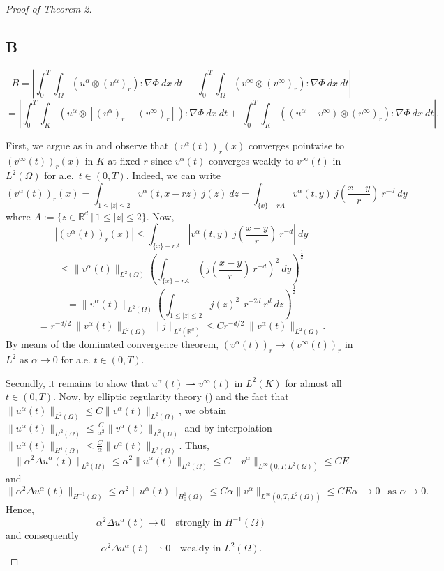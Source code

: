 \documentclass{amsart}
\begin{document}
\begin{proof}[Proof of Theorem 2]
\subsection*{B}
$$ B = \left| \int_0^T \int_{\Omega} (u^{\alpha} \otimes (v^{\alpha})_r) : \nabla \Phi \ dx \ dt - \ \int_0^T \int_{\Omega} (v^{\infty} \otimes (v^{\infty})_r) : \nabla \Phi \ dx \ dt \right|$$
$$ = \left| \int_0^T \int_{K} \left(u^{\alpha} \otimes [(v^{\alpha})_r-(v^{\infty})_r]\right) : \nabla \Phi \ dx \ dt + \ \int_0^T \int_{K} ((u^{\alpha}-v^{\infty}) \otimes (v^{\infty})_r) : \nabla \Phi \ dx \ dt \right|. $$

First, we argue as in \cite{Constantin.2018} and observe that $(v^{\alpha}(t))_r(x)$ converges pointwise to $(v^{\infty}(t))_r(x)$ in $K$ at fixed $r$ since $v^{\alpha}(t)$ converges weakly to $v^{\infty}(t)$ in $L^2(\Omega)$ for a.e.\ $t\in (0,T)$. Indeed, we can write
$$ (v^{\alpha}(t))_r(x)=\int_{1\leq|z|\leq2} v^{\alpha}\left(t,x-rz\right) \ j(z) \ dz = \int_{\{x\}-rA} v^{\alpha}(t,y) \ j\left(\frac{x-y}{r}\right) \  r^{-d} \ dy$$
where $A:=\{z\in \mathbb{R}^d \ | \ 1\leq |z|\leq 2\}.$ Now,
$$ |(v^{\alpha}(t))_r(x)| \leq \int_{\{x\}-rA} \left| v^{\alpha}(t,y) \ j\left(\frac{x-y}{r}\right) \  r^{-d}\right| \ dy $$
$$ \leq \|v^{\alpha}(t)\|_{L^2(\Omega)} \left(\int_{\{x\}-rA} \left( j\left(\frac{x-y}{r}\right) \  r^{-d}\right)^2 \ dy\right)^{\frac{1}{2}} $$ 
$$= \|v^{\alpha}(t)\|_{L^2(\Omega)} \left(\int_{1\leq |z|\leq 2} j(z)^2 \ \  r^{-2d} \  r^d \ dz\right)^{\frac{1}{2}} $$
$$ = r^{-d/2} \ \|v^{\alpha}(t)\|_{L^2(\Omega)} \ \|j\|_{L^2(\mathbb{R}^d)} \leq C  r^{-d/2} \ \|v^{\alpha}(t)\|_{L^2(\Omega)}. $$
By means of the dominated convergence theorem, $(v^{\alpha}(t))_r \to (v^{\infty}(t))_r$ in $L^2$ as $\alpha \to 0$ for a.e. $t\in (0,T)$.

Secondly, it remains to show that $u^{\alpha}(t) \rightharpoonup v^{\infty}(t)$ in $L^2(K)$ for almost all $t\in (0,T)$.
Now, by elliptic regularity theory (\cite[Theorem 8.12]{Gilbarg.1983}) and the fact that $\|u^{\alpha}(t)\|_{L^2(\Omega)} \leq C  \|v^{\alpha}(t)\|_{L^2(\Omega)}$, we obtain $\|u^{\alpha}(t)\|_{H^2(\Omega)} \leq \frac{C}{\alpha^2}  \|v^{\alpha}(t)\|_{L^2(\Omega)}$ and  by interpolation $\|u^{\alpha}(t)\|_{H^1(\Omega)} \leq \frac{C}{\alpha}  \|v^{\alpha}(t)\|_{L^2(\Omega)}$. Thus,
$$ \|\alpha^2 \Delta u^{\alpha}(t)\|_{L^2(\Omega)} \leq  \alpha^2 \|u^{\alpha}(t)\|_{H^2(\Omega)} \leq C   \|v^{\alpha}\|_{L^{\infty}(0,T;L^2(\Omega))} \leq CE $$
and
$$ \|\alpha^2 \Delta u^{\alpha}(t)\|_{H^{-1}(\Omega)} \leq \alpha^2 \|u^{\alpha}(t)\|_{H^1_0(\Omega)} \leq C \alpha  \|v^{\alpha}\|_{L^{\infty}(0,T;L^2(\Omega))} \leq CE \alpha \ \to 0 \ \ \text{ as } \alpha \to 0.$$
Hence,
$$ \alpha^2 \Delta u^{\alpha}(t) \to 0 \ \ \ \text{ strongly in } H^{-1}(\Omega)$$
and consequently
$$ \alpha^2 \Delta u^{\alpha}(t) \rightharpoonup 0 \ \ \ \text{ weakly in } L^2(\Omega).$$


\end{proof}
\end{document}
